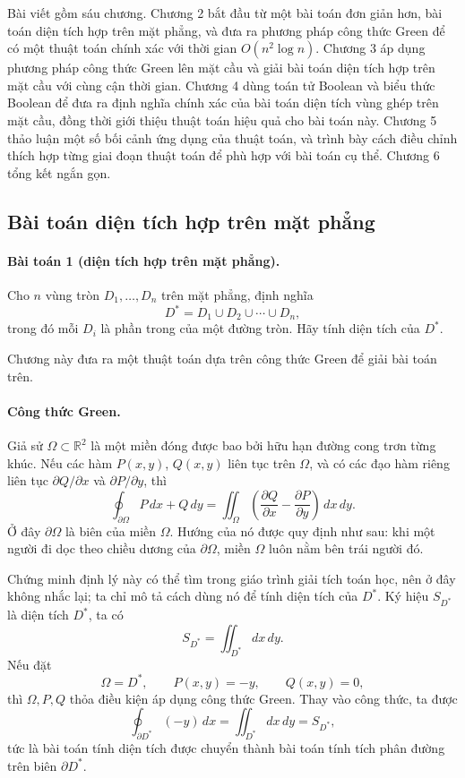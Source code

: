 \documentclass[11pt]{article}
\begin{document}
Bài viết gồm sáu chương. Chương 2 bắt đầu từ một bài toán đơn giản hơn, bài
toán diện tích hợp trên mặt phẳng, và đưa ra phương pháp công thức Green để có
một thuật toán chính xác với thời gian \(O(n^2\log n)\). Chương 3 áp dụng
phương pháp công thức Green lên mặt cầu và giải bài toán diện tích hợp trên mặt
cầu với cùng cận thời gian. Chương 4 dùng toán tử Boolean và biểu thức Boolean
để đưa ra định nghĩa chính xác của bài toán diện tích vùng ghép trên mặt cầu,
đồng thời giới thiệu thuật toán hiệu quả cho bài toán này. Chương 5 thảo luận
một số bối cảnh ứng dụng của thuật toán, và trình bày cách điều chỉnh thích hợp
từng giai đoạn thuật toán để phù hợp với bài toán cụ thể. Chương 6 tổng kết
ngắn gọn.

\subsection{Bài toán diện tích hợp trên mặt phẳng}

\paragraph{Bài toán 1 (diện tích hợp trên mặt phẳng).}
Cho \(n\) vùng tròn \(D_1,\ldots,D_n\) trên mặt phẳng, định nghĩa
\[
  D^*=D_1\cup D_2\cup\cdots\cup D_n,
\]
trong đó mỗi \(D_i\) là phần trong của một đường tròn. Hãy tính diện tích của
\(D^*\).

Chương này đưa ra một thuật toán dựa trên công thức Green để giải bài toán
trên.

\paragraph{Công thức Green.}
Giả sử \(\Omega\subset\mathbb R^2\) là một miền đóng được bao bởi hữu hạn đường
cong trơn từng khúc. Nếu các hàm \(P(x,y)\), \(Q(x,y)\) liên tục trên
\(\Omega\), và có các đạo hàm riêng liên tục \(\partial Q/\partial x\) và
\(\partial P/\partial y\), thì
\[
  \oint_{\partial\Omega} P\,dx+Q\,dy
  =
  \iint_{\Omega}\left(\frac{\partial Q}{\partial x}
  -\frac{\partial P}{\partial y}\right)\,dx\,dy.
\]
Ở đây \(\partial\Omega\) là biên của miền \(\Omega\). Hướng của nó được quy
định như sau: khi một người đi dọc theo chiều dương của \(\partial\Omega\),
miền \(\Omega\) luôn nằm bên trái người đó.

Chứng minh định lý này có thể tìm trong giáo trình giải tích toán học, nên ở
đây không nhắc lại; ta chỉ mô tả cách dùng nó để tính diện tích của \(D^*\).
Ký hiệu \(S_{D^*}\) là diện tích \(D^*\), ta có
\[
  S_{D^*}=\iint_{D^*} dx\,dy.
\]
Nếu đặt
\[
  \Omega=D^*,\qquad P(x,y)=-y,\qquad Q(x,y)=0,
\]
thì \(\Omega,P,Q\) thỏa điều kiện áp dụng công thức Green. Thay vào công thức,
ta được
\[
  \oint_{\partial D^*}(-y)\,dx
  =\iint_{D^*} dx\,dy
  =S_{D^*},
\]
tức là bài toán tính diện tích được chuyển thành bài toán tính tích phân đường
trên biên \(\partial D^*\).
\end{document}
